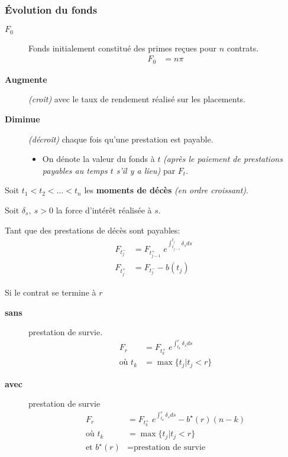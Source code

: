 \documentclass[10pt, french]{article}
\begin{document}
\begin{multicols*}{3}
\subsubsection*{\textcolor{amber(sae/ece)}{Évolution du fonds}}
\begin{description}
	\item[$F_{0}$]	Fonds initialement constitué des primes reçues pour $n$ contrats.
		\begin{align*}
		F_{0} 
		&=	n \pi
		\end{align*}
	\item[\textbf{Augmente}] \textit{(croît)} avec le taux de rendement réalisé sur les placements.
	\item[\textbf{Diminue}] \textit{(décroît)} chaque fois qu'une prestation est payable.
		\begin{itemize}
		\item	On dénote la valeur du fonds à $t$ \textit{(après le paiement de prestations payables au temps $t$ s'il y a lieu)} par $F_{t}$.
		\end{itemize}
\end{description}

Soit $t_1 < t_2 < \dots < t_n$ les \textbf{moments de décès} \textit{(en ordre croissant)}. 

Soit $\delta_s, \ s > 0$ la force d'intérêt réalisée à $s$.

Tant que des prestations de décès sont payables:
\begin{align*}
	F_{t_j^{-}} &= F_{t_{j-1}^{+}} \; e^{\int_{t_{j-1}}^{t_j} \delta_s ds} \\
	F_{t_j^{+}} &= F_{t_j^{-}} - b(t_j)
\end{align*}

Si le contrat se termine à $r$ 
\begin{description}
	\item[\textbf{sans}] prestation de survie.
		\begin{align*}
		F_{r} 
		&=	F_{t_{k}^{+}} \; e^{\int_{t_{k}}^{r} \delta_s ds} \\
		\text{où } 
		t_{k} 
		&=	\max \{t_j | t_j < r\} 
		\end{align*}
	\item[\textbf{avec}] prestation de survie
		\begin{align*}
		F_{r} 
		&=	F_{t_{k}^{+}} \; e^{\int_{t_{k}}^{r} \delta_s ds} - b^{\star}(r)(n - k) \\
		\text{où } 
		t_{k} 
		&=	\max \{t_j | t_j < r\}  \\
		\text{et } 
		b^{\star}(r)
		&=	\text{prestation de survie}  
		\end{align*}
\end{description}




\end{multicols*}
\end{document}
